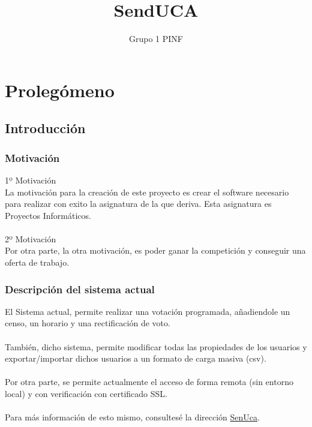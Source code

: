 \documentclass[12pt,letterpaper]{report}
\title{SendUCA}
\author{Grupo 1 PINF}
\begin{document}
	\maketitle
	\thispagestyle{empty}
	\newpage
	\tableofcontents
	
	
	
	\lstset{language=bash, numbers=left, numberstyle=\tiny, numbersep=10pt, firstnumber=1, stepnumber=1}
	
\chapter{Prolegómeno}		
\section{Introducción}
	\subsection{Motivación}
		\noindent 1º Motivación\\
		La motivación para la creación de este proyecto es crear el software necesario
		para realizar con exito la asignatura de la que deriva. Esta asignatura es Proyectos Informáticos.
		\\~\\
		\noindent 2º Motivación\\
		Por otra parte, la otra motivación, es poder ganar la competición y conseguir
		una oferta de trabajo.
	\subsection{Descripción del sistema actual}
		El Sistema actual, permite realizar una votación programada, añadiendole un censo, un horario
		y una rectificación de voto.
		\\~\\
		También, dicho sistema, permite modificar todas las propiedades de los usuarios y exportar/importar
		dichos usuarios a un formato de carga masiva (csv).
		\\~\\
		Por otra parte, se permite actualmente el acceso de forma remota (sin entorno local) y con verificación
		con certificado SSL.
		\\~\\
		Para más información de esto mismo, consultesé la dirección \href{https://senuca.herokuapp.com/}{SenUca}.
\end{document}
